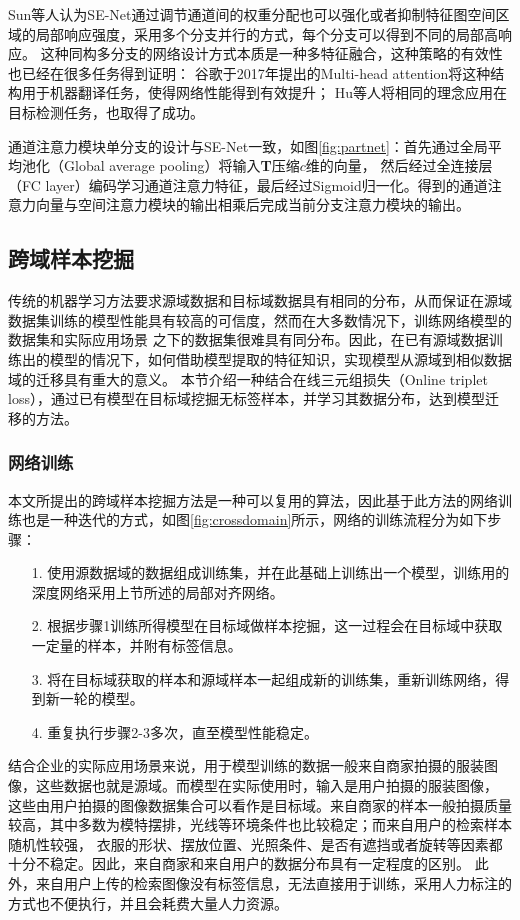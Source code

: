 Sun等人认为SE-Net通过调节通道间的权重分配也可以强化或者抑制特征图空间区域的局部响应强度，采用多个分支并行的方式，每个分支可以得到不同的局部高响应\cite{sun2018multi}。
这种同构多分支的网络设计方式本质是一种多特征融合，这种策略的有效性也已经在很多任务得到证明：
谷歌于2017年提出的Multi-head attention\cite{vaswani2017attention}将这种结构用于机器翻译任务，使得网络性能得到有效提升；
Hu等人将相同的理念应用在目标检测任务\cite{hu2018relation}，也取得了成功。

通道注意力模块单分支的设计与SE-Net一致，如图\ref{fig:partnet}：首先通过全局平均池化（Global average pooling）将输入\textbf{T}压缩$c$维的向量，
然后经过全连接层（FC layer）编码学习通道注意力特征，最后经过Sigmoid归一化。得到的通道注意力向量与空间注意力模块的输出相乘后完成当前分支注意力模块的输出。

\subsection{跨域样本挖掘}
传统的机器学习方法要求源域数据和目标域数据具有相同的分布，从而保证在源域数据集训练的模型性能具有较高的可信度，然而在大多数情况下，训练网络模型的数据集和实际应用场景
之下的数据集很难具有同分布。因此，在已有源域数据训练出的模型的情况下，如何借助模型提取的特征知识，实现模型从源域到相似数据域的迁移具有重大的意义。
本节介绍一种结合在线三元组损失（Online triplet loss），通过已有模型在目标域挖掘无标签样本，并学习其数据分布，达到模型迁移的方法。

\subsubsection{网络训练}

本文所提出的跨域样本挖掘方法是一种可以复用的算法，因此基于此方法的网络训练也是一种迭代的方式，如图\ref{fig:crossdomain}所示，网络的训练流程分为如下步骤：
\begin{itemize}
  \item[1.] 使用源数据域的数据组成训练集，并在此基础上训练出一个模型，训练用的深度网络采用上节所述的局部对齐网络。
  \item[2.] 根据步骤1训练所得模型在目标域做样本挖掘，这一过程会在目标域中获取一定量的样本，并附有标签信息。
  \item[3.] 将在目标域获取的样本和源域样本一起组成新的训练集，重新训练网络，得到新一轮的模型。
  \item[4.] 重复执行步骤2-3多次，直至模型性能稳定。
\end{itemize}

结合企业的实际应用场景来说，用于模型训练的数据一般来自商家拍摄的服装图像，这些数据也就是源域。而模型在实际使用时，输入是用户拍摄的服装图像，
这些由用户拍摄的图像数据集合可以看作是目标域。来自商家的样本一般拍摄质量较高，其中多数为模特摆排，光线等环境条件也比较稳定；而来自用户的检索样本随机性较强，
衣服的形状、摆放位置、光照条件、是否有遮挡或者旋转等因素都十分不稳定。因此，来自商家和来自用户的数据分布具有一定程度的区别。
此外，来自用户上传的检索图像没有标签信息，无法直接用于训练，采用人力标注的方式也不便执行，并且会耗费大量人力资源。

